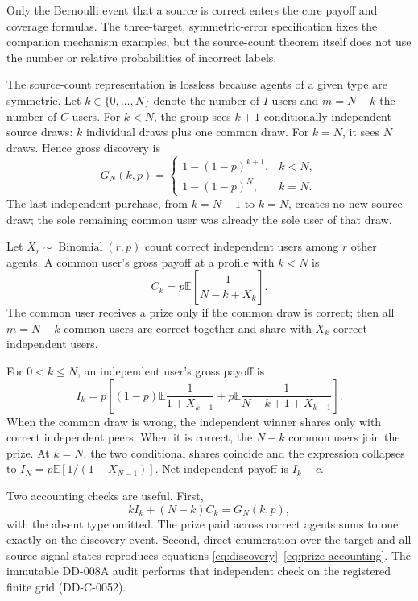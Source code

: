 \documentclass[11pt]{article}
\newcommand{\E}{\mathbb{E}}
\begin{document}
Only the Bernoulli event that a source is correct enters the core payoff and
coverage formulas. The three-target, symmetric-error specification fixes the
companion mechanism examples, but the source-count theorem itself does not use
the number or relative probabilities of incorrect labels.

The source-count representation is lossless because agents of a given type are
symmetric. Let $k\in\{0,\ldots,N\}$ denote the number of $I$ users and
$m=N-k$ the number of $C$ users. For $k<N$, the group sees $k+1$ conditionally
independent source draws: $k$ individual draws plus one common draw. For $k=N$,
it sees $N$ draws. Hence gross discovery is
\begin{equation}
 G_N(k,p)=
 \begin{cases}
 1-(1-p)^{k+1}, & k<N,\\
 1-(1-p)^N, & k=N.
 \end{cases}
 \label{eq:discovery}
\end{equation}
The last independent purchase, from $k=N-1$ to $k=N$, creates no new source
draw; the sole remaining common user was already the sole user of that draw.

Let $X_r\sim\operatorname{Binomial}(r,p)$ count correct independent users among
$r$ other agents. A common user's gross payoff at a profile with $k<N$ is
\begin{equation}
 C_k=p\E\left[\frac{1}{N-k+X_k}\right].
 \label{eq:common-payoff}
\end{equation}
The common user receives a prize only if the common draw is correct; then all
$m=N-k$ common users are correct together and share with $X_k$ correct
independent users.

For $0<k\leq N$, an independent user's gross payoff is
\begin{equation}
 I_k=p\left[(1-p)\E\frac{1}{1+X_{k-1}}
 +p\E\frac{1}{N-k+1+X_{k-1}}\right].
 \label{eq:independent-payoff}
\end{equation}
When the common draw is wrong, the independent winner shares only with correct
independent peers. When it is correct, the $N-k$ common users join the prize.
At $k=N$, the two conditional shares coincide and the expression collapses to
$I_N=p\E[1/(1+X_{N-1})]$. Net independent payoff is $I_k-c$.

Two accounting checks are useful. First,
\begin{equation}
 kI_k+(N-k)C_k=G_N(k,p),
 \label{eq:prize-accounting}
\end{equation}
with the absent type omitted. The prize paid across correct agents sums to one
exactly on the discovery event. Second, direct enumeration over the target and
all source-signal states reproduces equations
\eqref{eq:discovery}--\eqref{eq:prize-accounting}. The immutable DD-008A audit
performs that independent check on the registered finite grid (DD-C-0052).
\end{document}
